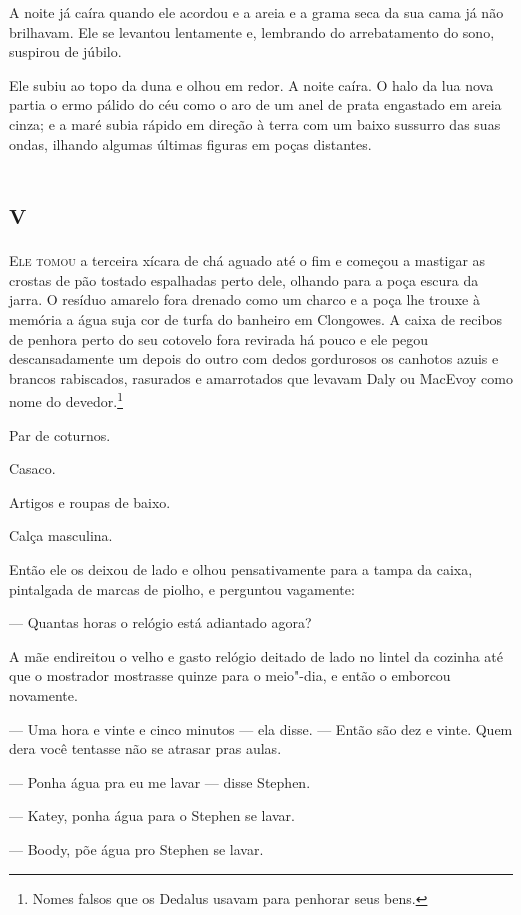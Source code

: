 A noite já caíra quando ele acordou e a areia e a grama seca da sua cama
já não brilhavam. Ele se levantou lentamente e, lembrando do
arrebatamento do sono, suspirou de júbilo.

Ele subiu ao topo da duna e olhou em redor. A noite caíra. O halo da lua
nova partia o ermo pálido do céu como o aro de um anel de prata engastado
em areia cinza; e a maré subia rápido em direção à terra com um baixo
sussurro das suas ondas, ilhando algumas últimas figuras em poças
distantes.


\chapter{\textsc{v}}

\textsc{Ele tomou} a terceira xícara de chá aguado até o fim e começou a mastigar
as crostas de pão tostado espalhadas perto dele, olhando para a poça
escura da jarra. O resíduo amarelo fora drenado como um charco e a poça
lhe trouxe à memória a água suja cor de turfa do banheiro em Clongowes.
A caixa de recibos de penhora perto do seu cotovelo fora revirada há
pouco e ele pegou descansadamente um depois do outro com dedos
gordurosos os canhotos azuis e brancos rabiscados, rasurados e
amarrotados que levavam Daly ou MacEvoy como nome do devedor.\footnote{ Nomes falsos 
que os Dedalus usavam para penhorar seus bens.}
\smallskip

 Par de coturnos.

 Casaco.

 Artigos e roupas de baixo.

 Calça masculina.
\smallskip

Então ele os deixou de lado e olhou pensativamente para a tampa da
caixa, pintalgada de marcas de piolho, e perguntou vagamente:

 --- Quantas horas o relógio está adiantado agora?

A mãe endireitou o velho e gasto relógio deitado de lado no lintel da
cozinha até que o mostrador mostrasse quinze para o meio"-dia, e então o
emborcou novamente.

 --- Uma hora e vinte e cinco minutos --- ela disse. --- Então são dez e vinte.
Quem dera você tentasse não se atrasar pras aulas.

 --- Ponha água pra eu me lavar --- disse Stephen.

 --- Katey, ponha água para o Stephen se lavar.

 --- Boody, põe água pro Stephen se lavar.

